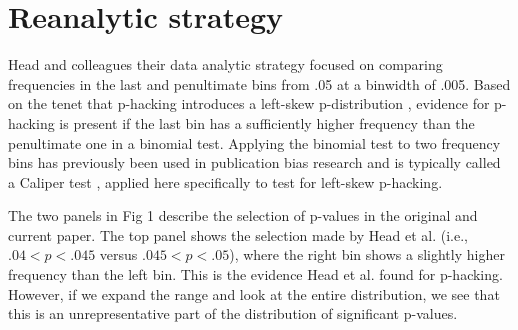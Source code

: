\section*{Reanalytic strategy}
Head and colleagues their data analytic strategy focused on comparing frequencies in the last and penultimate bins from .05 at a binwidth of .005. Based on the tenet that p-hacking introduces a left-skew p-distribution \cite{Simonsohn2014}, evidence for p-hacking is present if the last bin has a sufficiently higher frequency than the penultimate one in a binomial test. Applying the binomial test to two frequency bins has previously been used in publication bias research and is typically called a Caliper test \cite{gerber2010, kuhberger2014}, applied here specifically to test for left-skew p-hacking.

The two panels in Fig 1 describe the selection of p-values in the original and current paper. The top panel shows the selection made by Head et al. (i.e., $.04<p< .045$ versus $.045<p<.05$), where the right bin shows a slightly higher frequency than the left bin. This is the evidence Head et al. found for p-hacking. However, if we expand the range and look at the entire distribution, we see that this is an unrepresentative part of the distribution of significant p-values.
  
  